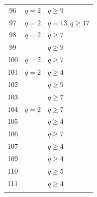 \documentclass[a4paper, 11pt, reqno]{amsart}
\numberwithin{equation}{section} \numberwithin{figure}{section}
\theoremstyle{definition}
\numberwithin{lemma}{section}
\begin{document}
\begin{table}[ht]
\begin{minipage}{0.55\textwidth}
\begin{tabular}{|c|l|l|}
            96 & $q = 2 $ & $q \geq 9$\\
            97 & $q = 2 $ & $q = 13, q \geq 17$\\
            98 & $q = 2 $ & $q \geq 7$\\
            99 & & $q \geq 9$\\
            100 & $q = 2 $ & $q \geq 7$\\
            101 & $q = 2 $ & $q \geq 4$\\
            102 & & $q \geq 9$\\
            103 & & $q \geq 7$\\
            104 & $q = 2 $ & $q \geq 7$\\
            105 & & $q \geq 4$\\
            106 & & $q \geq 7$\\
            107 & & $q \geq 4$\\
            \arrayrulecolor{lightgray}\hline
            \arrayrulecolor{black}
            109 & & $q \geq 4$\\
            110 & & $q \geq 5$\\
            111 & & $q \geq 4$\\
            & & \\
            \hline
        \end{tabular}
    \end{minipage}
    \label{tab:existencedP1withline}
\end{table}
\end{document}
